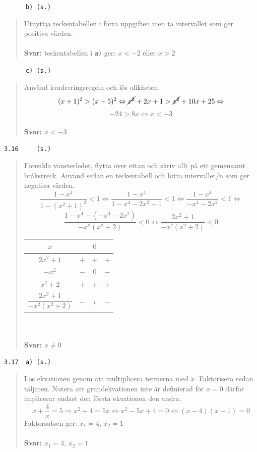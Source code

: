 \documentclass[a4paper]{article}
\newcommand{\tskcol}[1]{\textcolor{tskcol}{#1}}
\begin{document}
	\texttt{\tskcol{~~~~~~b) (s.)}}
	\begin{quotation}
		\noindent
		Utnyttja teckentabellen i förra uppgiften men ta intervallet som ger positiva värden.
		\\ \\
		\textbf{Svar:} teckentabellen i \texttt{a)} ger: $x<-2$ eller $x>2$
	\end{quotation}
	
	\texttt{\tskcol{~~~~~~c) (s.)}}
	\begin{quotation}
		\noindent
		Använd kvadreringsregeln och lös olikheten.
		\[(x+1)^2>(x+5)^2 \Leftrightarrow
		\cancel{x^2}+2x+1>\cancel{x^2}+10x+25\Leftrightarrow \]
		\[-24>8x \Leftrightarrow
		x<-3\]
		\\
		\textbf{Svar:} $x<-3$ 
	\end{quotation}
	
	\pagebreak
	\texttt{\tskcol{3.16~~~~ (s.)}}
	\begin{quotation}
		\noindent
		Förenkla vänsterledet, flytta över ettan och skriv allt på ett gemensamt bråkstreck. Använd sedan en teckentabell och hitta intervallet/n som ger negativa värden.
		\[\dfrac{1-x^4}{1-(x^2+1)^2}<1 \Leftrightarrow
		\dfrac{1-x^4}{1-x^4-2x^2-1}<1 \Leftrightarrow
		\dfrac{1-x^4}{-x^4-2x^2}<1 \Leftrightarrow\]
		\[\dfrac{1-x^4-(-x^4-2x^2)}{-x^2(x^2+2)}<0 \Leftrightarrow
		\dfrac{2x^2+1}{-x^2(x^2+2)}<0\]
		\begin{tabular}{c|c|c|c}
			$x$ & & $0$ & \\ \hline
			$2x^2+1$                      & $+$ & $+$ & $+$ \\
			$-x^2$                        & $-$ & $0$ & $-$ \\
			$x^2+2$                       & $+$ & $+$ & $+$ \\ \hline
			$\dfrac{2x^2+1}{-x^2(x^2+2)}$ & $-$ &$\wr$& $-$ 
		\end{tabular}
		\\ \\
		\textbf{Svar:} $x\neq 0$
	\end{quotation}
	
	\texttt{\tskcol{3.17~~a) (s.)}}
	\begin{quotation}
		\noindent
		Lös ekvationen genom att multiplicera termerna med $x$. Faktorisera sedan täljaren. Notera att grundekvationen inte är definierad för $x=0$ därför implicerar endast den första ekvationen den andra.
		\[x+\dfrac{4}{x}=5 \Rightarrow
		x^2+4=5x \Leftrightarrow
		x^2-5x+4=0 \Leftrightarrow
		(x-4)(x-1)=0\]
		Faktorsatsen ger:
		$x_1=4$, $x_2=1$
		\\ \\
		\textbf{Svar:} $x_1=4$, $x_2=1$
	\end{quotation}
	
\end{document}
